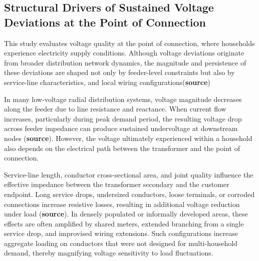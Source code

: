 \documentclass[review]{elsarticle}
\begin{document}
\subsection{Structural Drivers of Sustained Voltage Deviations at the Point of Connection }

This study evaluates voltage quality at the point of connection, where households experience electricity supply conditions. Although voltage deviations originate from broader distribution network dynamics, the magnitude and persistence of these deviations are shaped not only by feeder-level constraints but also by service-line characteristics, and local wiring configurations(\textbf{source})

In many low-voltage radial distribution systems, voltage magnitude decreases along the feeder due to line resistance and reactance. When current flow increases, particularly during peak demand period, the resulting voltage drop across feeder impedance can produce sustained undervoltage at downstream nodes (\textbf{source}). However, the voltage ultimately experienced within a household also depends on the electrical path between the transformer and the point of connection.

Service-line length, conductor cross-sectional area, and joint quality influence the effective impedance between the transformer secondary and the customer endpoint. Long service drops, undersized conductors, loose terminals, or corroded connections increase resistive losses, resulting in additional voltage reduction under load (\textbf{source}). In densely populated or informally developed areas, these effects are often amplified by shared meters, extended branching from a single service drop, and improvised wiring extensions. Such configurations increase aggregate loading on conductors that were not designed for multi-household demand, thereby magnifying voltage sensitivity to load fluctuations.
\end{document}

